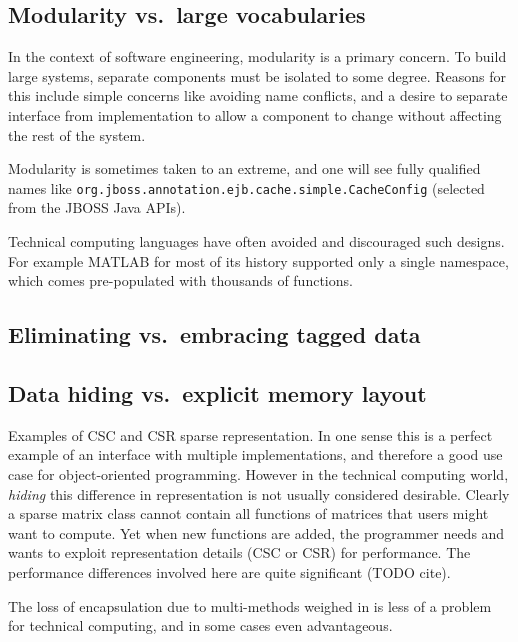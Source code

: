 
\subsection{Modularity vs.\ large vocabularies}

In the context of software engineering, modularity is a primary concern.
To build large systems, separate components must be isolated to some
degree.
Reasons for this include simple concerns like avoiding name conflicts,
and a desire to separate interface from implementation to allow
a component to change without affecting the rest of the system.

Modularity is sometimes taken to an extreme, and one will see
fully qualified names like \texttt{org.jboss.annotation.ejb.cache.simple.CacheConfig}
(selected from the JBOSS Java APIs).

Technical computing languages have often avoided and discouraged such
designs. For example MATLAB for most of its history supported only a single
namespace, which comes pre-populated with thousands of functions.


\subsection{Eliminating vs.\ embracing tagged data}

\subsection{Data hiding vs.\ explicit memory layout}

Examples of CSC and CSR sparse representation.
In one sense this is a perfect example of an interface with multiple implementations,
and therefore a good use case for object-oriented programming.
However in the technical computing world, \emph{hiding} this difference in
representation is not usually considered desirable.
Clearly a sparse matrix class cannot contain all functions of matrices that users
might want to compute.
Yet when new functions are added, the programmer needs and wants to exploit
representation details (CSC or CSR) for performance.
The performance differences involved here are quite significant (TODO cite).

The loss of encapsulation due to multi-methods weighed in \cite{binarymethods}
is less of a problem for technical computing, and in some cases even
advantageous.

